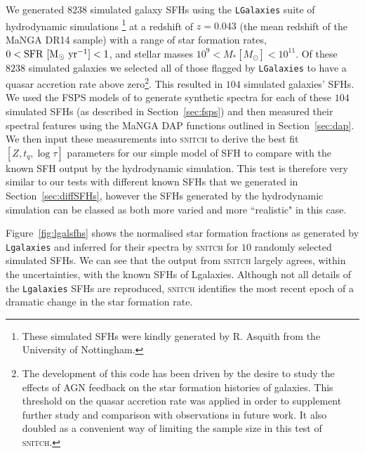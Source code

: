 \documentclass[useAMS,usenatbib]{mn2e}
\begin{document}
We generated $8238$ simulated galaxy SFHs using the \texttt{LGalaxies} suite of hydrodynamic simulations \citep{henriques15}\footnote{These simulated SFHs were kindly generated by R. Asquith from the University of Nottingham.} at a redshift of $z=0.043$ (the mean redshift of the MaNGA DR14 sample) with a range of star formation rates, $0 < \rm{SFR}~[M_{\odot}~\rm{yr}^{-1}] < 1$, and stellar masses $10^9 < M_{*} [M_{\odot}] < 10^{11}$. Of these $8238$ simulated galaxies we selected all of those flagged by \texttt{LGalaxies} to have a quasar accretion rate above zero\footnote{The development of this code has been driven by the desire to study the effects of AGN feedback on the star formation histories of galaxies. This threshold on the quasar accretion rate was applied in order to supplement further study and comparison with observations in future work. It also doubled as a convenient way of limiting the sample size in this test of \textsc{snitch}.}. This resulted in $104$ simulated galaxies' SFHs. We used the FSPS models of \cite{conroy10} to generate synthetic spectra for each of these $104$ simulated SFHs (as described in Section~\ref{sec:fsps}) and then measured their spectral features using the MaNGA DAP functions outlined in Section~\ref{sec:dap}. We then input these measurements into \textsc{snitch} to derive the best fit $[Z, t_q, \log \tau]$ parameters for our simple model of SFH to compare with the known SFH output by the hydrodynamic simulation. This test is therefore very similar to our tests with different known SFHs that we generated in Section~\ref{sec:diffSFHs}, however the SFHs generated by the hydrodynamic simulation can be classed as both more varied and more ``realistic" in this case.

Figure~\ref{fig:lgalsfhs} shows the normalised star formation fractions as generated by \texttt{Lgalaxies} and inferred for their spectra by \textsc{snitch} for $10$ randomly selected simulated SFHs. We can see that the output from \textsc{snitch} largely agrees, within the uncertainties, with the known SFHs of Lgalaxies. Although not all details of the \texttt{Lgalaxies} SFHs are reproduced, \textsc{snitch} identifies the most recent epoch of a dramatic change in the star formation rate.
\end{document}
